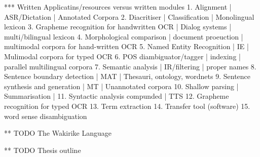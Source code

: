 *** Written Applicatins/resources versus written modules
1. Alignment | ASR/Dictation | Annotated Corpora
2. Diacritiser | Classification | Monolingual lexicon
3. Grapheme recognition for handwritten OCR | Dialog systems | multi/bilingual lexicon
4. Morphological comparison | document proeuction | multimodal corpora for hand-written OCR
5. Named Entity Recognition | IE | Mulimodal corpora for typed OCR
6. POS diambiguator/tagger | indexing | parallel multilingual corpora
7. Semantic analysis | IR/filtering | proper names
8. Sentence boundary detection | MAT | Thesauri, ontology, wordnets
9. Sentence synthesis and generation | MT | Unannotated corpora
10. Shallow parsing | Summarisation | 
11. Syntactic analysis compunded | TTS
12. Grapheme recognition for typed OCR
13. Term extraction
14. Transfer tool (software)
15. word sense disambiguation

** TODO The Wakirike Language

** TODO Thesis outline

